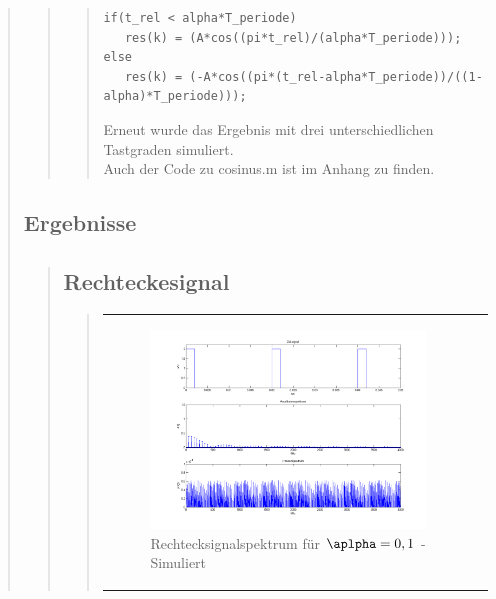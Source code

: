 \begin{quote}
\begin{quote}
\begin{quote}
\begin{lstlisting}
if(t_rel < alpha*T_periode)
   res(k) = (A*cos((pi*t_rel)/(alpha*T_periode)));
else
   res(k) = (-A*cos((pi*(t_rel-alpha*T_periode))/((1-alpha)*T_periode)));
\end{lstlisting} 
            
                Erneut wurde das Ergebnis mit drei unterschiedlichen Tastgraden simuliert.\\
                
                Auch der Code zu cosinus.m ist im Anhang zu finden.\\
                
            \end{quote}
        \end{quote}


    
        
        
	
\subsection{Ergebnisse}
\begin{quote}
    \subsection{Rechteckesignal}
    \begin{quote}
            \begin{center}
            \begin{tabular}{ll}
            
            \hspace{-12em}
                \begin{minipage}{0.6\textwidth}
                    
                    \begin{figure}[H]
                        \label{fig:}            
                        \includegraphics[scale=0.25]{./Bilder/recht_alpha1.png} %
                        \caption{Rechtecksignalspektrum für $\aplpha = 0,1$ - Simuliert}
                    \end{figure}
                    

\end{minipage}
\end{tabular}
\end{center}
\end{quote}
\end{quote}
\end{quote}
